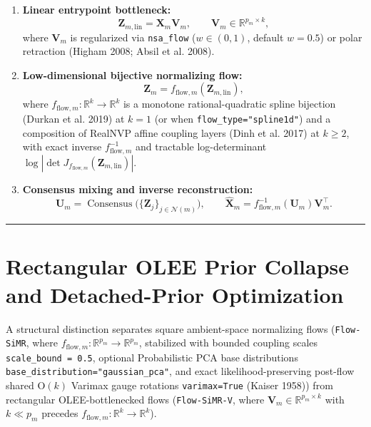 \documentclass[
  10pt,
  letterpaper,
]{report}
\providecommand{\tightlist}{%
  \setlength{\itemsep}{0pt}\setlength{\parskip}{0pt}}
\begin{document}
\begin{enumerate}
\def\labelenumi{\arabic{enumi}.}
\tightlist
\item
  \textbf{Linear entrypoint bottleneck:} \[
  \mathbf{Z}_{m,\text{lin}} = \mathbf{X}_m \mathbf{V}_m, \qquad \mathbf{V}_m \in \mathbb{R}^{p_m \times k},
  \] where \(\mathbf{V}_m\) is regularized via \texttt{nsa\_flow}
  (\(w \in (0, 1)\), default \(w = 0.5\)) or polar retraction (Higham
  2008; Absil et al. 2008).
\item
  \textbf{Low-dimensional bijective normalizing flow:} \[
  \mathbf{Z}_m = f_{\text{flow}, m}(\mathbf{Z}_{m,\text{lin}}),
  \] where \(f_{\text{flow}, m}: \mathbb{R}^k \to \mathbb{R}^k\) is a
  monotone rational-quadratic spline bijection (Durkan et al. 2019) at
  \(k = 1\) (or when \texttt{flow\_type="spline1d"}) and a composition
  of RealNVP affine coupling layers (Dinh et al. 2017) at \(k \ge 2\),
  with exact inverse \(f_{\text{flow}, m}^{-1}\) and tractable
  log-determinant
  \(\log |\det J_{f_{\text{flow}, m}}(\mathbf{Z}_{m,\text{lin}})|\).
\item
  \textbf{Consensus mixing and inverse reconstruction:} \[
  \mathbf{U}_m = \operatorname{Consensus}\big(\{\mathbf{Z}_j\}_{j \in \mathcal{N}(m)}\big), \qquad \hat{\mathbf{X}}_m = f_{\text{flow}, m}^{-1}(\mathbf{U}_m) \mathbf{V}_m^\top.
  \]
\end{enumerate}

\begin{center}\rule{0.5\linewidth}{0.5pt}\end{center}

\section{Rectangular OLEE Prior Collapse and Detached-Prior
Optimization}\label{rectangular-olee-prior-collapse-and-detached-prior-optimization}

A structural distinction separates square ambient-space normalizing
flows (\texttt{Flow-SiMR}, where
\(f_{\text{flow},m}: \mathbb{R}^{p_m} \to \mathbb{R}^{p_m}\), stabilized
with bounded coupling scales \texttt{scale\_bound\ =\ 0.5}, optional
Probabilistic PCA base distributions
\texttt{base\_distribution="gaussian\_pca"}, and exact
likelihood-preserving post-flow shared \(\mathrm{O}(k)\) Varimax gauge
rotations \texttt{varimax=True} (Kaiser 1958)) from rectangular
OLEE-bottlenecked flows (\texttt{Flow-SiMR-V}, where
\(\mathbf{V}_m \in \mathbb{R}^{p_m \times k}\) with \(k \ll p_m\)
precedes \(f_{\text{flow},m}: \mathbb{R}^k \to \mathbb{R}^k\)).
\end{document}
